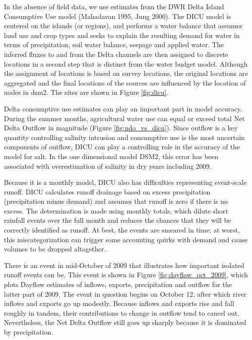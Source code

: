 In the absence of field data, we use estimates from the DWR Delta Island Consumptive Use model
 (Mahadavan 1995, Jung 2000). The DICU model is centered on the islands (or regions), and performs 
a water balance that assumes land use and crop types and seeks to explain the resulting demand for water
in terms of precipitation, soil water balance, seepage and applied water.
The inferred fluxes to and from the Delta channels are then assigned to discrete locations in a second
step that is distinct from the water budget model. Although the assignment of locations 
is based on survey locations, the original locations are aggregated and the final locations of 
the sources are influenced by the location of nodes in \gls{dsm2}. The sites are shown in Figure \ref{fig:dicu}.

Delta consumptive use estimates can play an important part in model accuracy. 
During the summer months, agricultural water use can equal or exceed total
Net Delta Outflow in magnitude (Figure \ref{fig:ndo_vs_dicu}). Since outflow is a 
key quantity controlling salinity intrusion and consumptive use is the most uncertain
 components of outflow, DICU can play a controlling role in the accuracy of the model for salt.
In the one dimensional model DSM2, this error has been associated 
with overestimation of salinity in dry years including 2009. 

Because it is a monthly model, DICU also has difficulties representing event-scale runoff. 
DICU calculates runoff drainage based on excess precipitation (precipitation minus demand) 
and assumes that runoff is zero if there is no excess. The determination is made using monthly totals, 
which dilute short rainfall events over the full month and reduces the chances that they will be 
correctly identified as runoff. At best, the events are smeared in time; at worst, this 
miscategorization can trigger some accounting quirks with demand and cause volumes to be dropped altogether.

There is an event in mid-October of 2009 that illustrates how important isolated runoff events can be. This event
is shown in Figure \ref{fig:dayflow_oct_2009}, which plots Dayflow estimates of inflows, exports, precipitation and outflow for the latter part of 2009. The event in question begins on October 12, after which river inflows and exports go up modestly.
Because inflows and exports rise and fall roughly in tandem, their contributions to change in outflow tend to cancel out. 
Nevertheless, the Net Delta Outflow still goes up sharply because it is dominated by precipitation.
 

